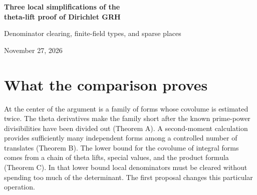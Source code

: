\documentclass[11pt,letterpaper]{article}
\begin{document}
\begin{center}
{\LARGE\bfseries Three local simplifications of the\\[4pt] theta-lift proof of Dirichlet GRH}\par
\vspace{7pt}
{\large Denominator clearing, finite-field types, and sparse places}\par
\vspace{6pt}
{\small November 27, 2026}
\end{center}
\begin{abstract}
The determinant lower bound in the Alpöge--Claude proof passes through an operator preserving Hecke eigenspaces. Its application only requires an operator that clears prescribed projections and has a large local determinant. In an integral basis adapted to the flag of lift generators, taking one row from each available operator gives such a determinant exactly. The same integral basis argument shortens the estimate for the determinant of a compressed lift. A second substitution enlarges the family of finite-field labels with a surviving Frobenius orbit and a common norm of sufficient order. At least $q^r/(2r)$ degree-$r$ labels qualify, giving a witness-loss bound $e^{-f/(2r)}$. A third substitution constructs the sparse infinite places from the graph of a quadratic polynomial and removes the choice of a large sphere. Each substitution has its own insertion point in the readable Lean development.
\end{abstract}

\section{What the comparison proves}
At the center of the argument is a family of forms whose covolume is estimated twice. The theta derivatives make the family short after the known prime-power divisibilities have been divided out (Theorem A). A second-moment calculation provides sufficiently many independent forms among a controlled number of translates (Theorem B). The lower bound for the covolume of integral forms comes from a chain of theta lifts, special values, and the product formula (Theorem C). In that lower bound local denominators must be cleared without spending too much of the determinant. The first proposal changes this particular operation.
\end{document}
